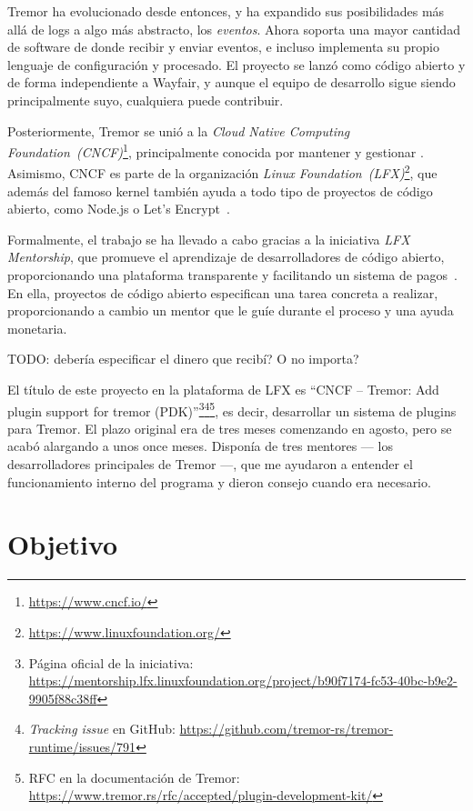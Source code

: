 Tremor ha evolucionado desde entonces, y ha expandido sus posibilidades más allá
de logs a algo más abstracto, los \emph{eventos}. Ahora soporta una mayor
cantidad de software de donde recibir y enviar eventos, e incluso implementa su
propio lenguaje de configuración y procesado. El proyecto se lanzó como código
abierto y de forma independiente a Wayfair, y aunque el equipo de desarrollo
sigue siendo principalmente suyo, cualquiera puede contribuir.

Posteriormente, Tremor se unió a la \emph{Cloud Native Computing
Foundation~(CNCF)}\footnote{\url{https://www.cncf.io/}}, principalmente conocida
por mantener y gestionar \textcite{k8s}. Asimismo, CNCF es parte de la
organización \emph{Linux
Foundation~(LFX)}\footnote{\url{https://www.linuxfoundation.org/}}, que además
del famoso kernel también ayuda a todo tipo de proyectos de código abierto, como
Node.js o Let's Encrypt~\cite{lfx_projects}.

Formalmente, el trabajo se ha llevado a cabo gracias a la iniciativa \emph{LFX
Mentorship}, que promueve el aprendizaje de desarrolladores de código abierto,
proporcionando una plataforma transparente y facilitando un sistema de
pagos~\cite{lfx_mentorship}. En ella, proyectos de código abierto especifican
una tarea concreta a realizar, proporcionando a cambio un mentor que le guíe
durante el proceso y una ayuda monetaria.

TODO: debería especificar el dinero que recibí? O no importa?

El título de este proyecto en la plataforma de LFX es ``CNCF -- Tremor: Add
plugin support for tremor (PDK)''\footnote{Página oficial de la iniciativa:
\url{https://mentorship.lfx.linuxfoundation.org/project/b90f7174-fc53-40bc-b9e2-9905f88c38ff}}\footnote{\emph{Tracking
issue} en GitHub:
\url{https://github.com/tremor-rs/tremor-runtime/issues/791}}\footnote{RFC en la
documentación de Tremor:
\url{https://www.tremor.rs/rfc/accepted/plugin-development-kit/}}, es decir,
desarrollar un sistema de plugins para Tremor. El plazo original era de tres
meses comenzando en agosto, pero se acabó alargando a unos once meses. Disponía
de tres mentores --- los desarrolladores principales de Tremor ---, que me
ayudaron a entender el funcionamiento interno del programa y dieron consejo
cuando era necesario.

\section{Objetivo}

